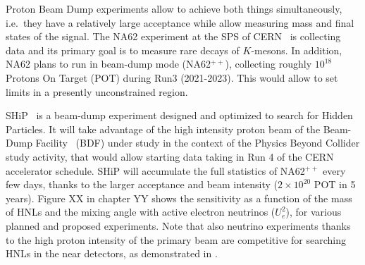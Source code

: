 Proton Beam Dump experiments allow to achieve both things simultaneously, i.e.\ they have a relatively large acceptance while allow measuring mass and final states of the signal. 
The NA62 experiment at the SPS of CERN~\cite{Anelli:2005ju} is collecting data and its primary goal is to measure rare decays of $K$-mesons. 
In addition, NA62 plans to run in beam-dump mode (NA62$^{++}$), collecting roughly $10^{18}$ Protons On Target (POT) during Run3 (2021-2023). This would allow to set limits in a presently unconstrained region. 

SHiP~\cite{Anelli:2015pba} is a beam-dump experiment designed and optimized to search for Hidden Particles. It will take advantage of the high intensity proton beam of the Beam-Dump Facility~\cite{SHiP:2018yqc} (BDF) under study in the context of the Physics Beyond Collider study activity, that would allow starting data taking in Run 4 of the CERN accelerator schedule. SHiP will accumulate the full statistics of NA62$^{++}$ every few days, thanks to the larger acceptance and beam intensity ($2\times 10^{20}$ POT in 5 years). 
Figure XX in chapter YY shows the sensitivity as a function of the mass of HNLs and the mixing angle with active electron neutrinos ($U^2_{e}$), for various planned and proposed experiments.
Note that also neutrino experiments thanks to the high proton intensity of the primary beam are competitive for searching HNLs in the near detectors, as demonstrated in \cite{Abe:2019kgx, Ballett:2019bgd, Arguelles:2019xgp}.

